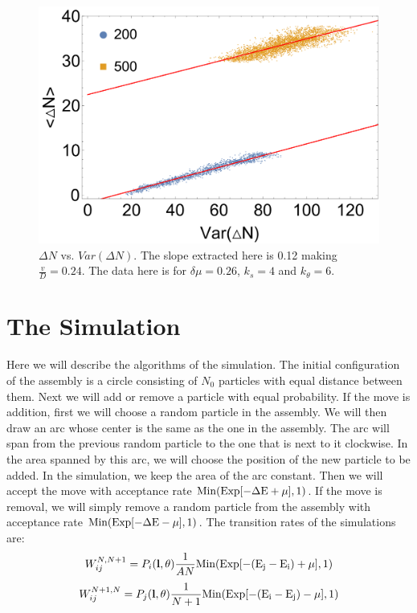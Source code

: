 \documentclass[amsmath,preprintnumbers,10pt,nofootinbib,prl,twocolumn]{revtex4-1}
\begin{document}
\begin{figure}
\centering
\includegraphics[scale=0.35]{deltaNvsVar.pdf}
\caption{$\Delta N$ vs. $Var(\Delta N)$. The slope extracted here is 0.12 making $\frac{v}{D}=0.24$. The data here is for $\delta\mu=0.26$, $k_s=4$ and $k_\theta = 6$.} \label{fig:fittingvelocity}
\end{figure}
\section{The Simulation}
Here we will describe the algorithms of the simulation. The initial configuration of the assembly is a circle consisting of $N_0$ particles with equal distance between them. Next we will add or remove a particle with equal probability. If the move is addition, first we will choose a random particle in the assembly. We will then draw an arc whose center is the same as the one in the assembly. The arc will span from the previous random particle to the one that is next to it clockwise. In the area spanned by this arc, we will choose the position of the new particle to be added. In the simulation, we keep the area of the arc constant. Then we will accept the move with acceptance rate $\rm{Min}(\rm{Exp}[-\Delta E +\mu],1)$. If the move is removal, we will simply remove a random particle from the assembly with acceptance rate $\rm{Min}(\rm{Exp}[-\Delta E -\mu],1)$. The transition rates of the simulations are:
\begin{equation}
W^{N,N+1}_{ij}=P_i(\bold{l},\bold{\theta})\frac{1}{AN}\rm{Min(Exp[-(E_j - E_i)+\mu],1)}
\end{equation}
\begin{equation}
W^{N+1,N}_{ij}=P_j(\bold{l},\bold{\theta})\frac{1}{N+1}\rm{Min(Exp[-(E_i - E_j)-\mu],1)}
\end{equation}
\end{document}
